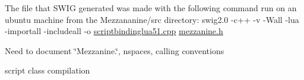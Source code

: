 The file that SWIG generated was made with the following command run on an ubuntu machine from the Mezzananine/src directory: swig2.0 -\/c++ -\/v -\/Wall -\/lua -\/importall -\/includeall -\/o \hyperlink{scriptbindinglua51_8cpp}{scriptbindinglua51.cpp} \hyperlink{mezzanine_8h}{mezzanine.h}

Need to document \char`\"{}Mezzanine.\char`\"{}, nspaces, calling conventions

script class compilation 